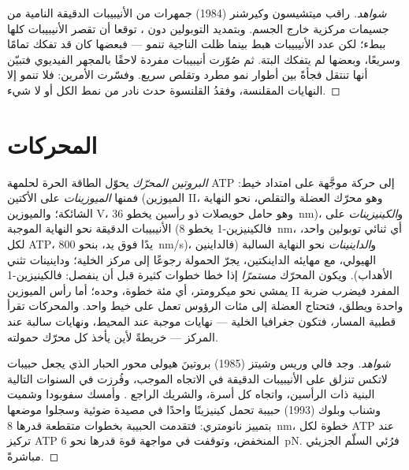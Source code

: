 \begin{proof}[شواهد]
راقب ميتشيسون وكيرشنر (1984) جمهرات من الأنيبيبات الدقيقة
النامية من جسيمات مركزية خارج الجسم. وبتمديد التوبولين دون
، توقعا أن تقصر الأنيبيبات كلها
ببطء؛ لكن عدد الأنيبيبات هبط بينما ظلت الناجية
تنمو --- فبعضها كان قد تفكك تمامًا وسريعًا، وبعضها لم يتفكك
البتة. ثم صُوّرت أنيبيبات مفردة لاحقًا بالمجهر الفيديوي فتبيّن أنها
تنتقل فجأةً بين أطوار نمو مطرد وتقلص سريع.
وفسّرت  الأمرين: فلا تنمو إلا النهايات المقلنسة، وفقدُ
القلنسوة حدث نادر من نمط الكل أو لا شيء.
\end{proof}

\section{المحركات}

\begin{definition}\label{def:b3:cytoskeleton-motility:motors}
\emph{البروتين المحرّك} يحوّل الطاقة الحرة لحلمهة ATP إلى
حركة موجَّهة على امتداد خيط: فمنها \emph{الميوزينات} على الأكتين (الميوزين
II، وهو محرّك العضلة والتقلص، نحو النهاية الشائكة؛ والميوزين V،
وهو حامل حويصلات ذو رأسين يخطو \qty{36}{nm})، و\emph{الكينيزينات}
على الأنيبيبات الدقيقة نحو النهاية الموجبة (فالكينيزين-1 يخطو \qty{8}{nm}،
أي ثنائي توبولين واحد، لكل ATP، يدًا فوق يد، بنحو \qty{800}{nm/s})،
و\emph{الداينينات} نحو النهاية السالبة (فالداينين الهيولي، مع
مهايئه الداينكتين، يجرّ الحمولة رجوعًا إلى مركز الخلية؛ وداينينات 
تثني الأهداب). ويكون المحرّك \emph{مستمرًا} إذا خطا خطوات كثيرة قبل أن
ينفصل: فالكينيزين-1 يمشي نحو ميكرومتر، أي مئة خطوة، وحده؛
أما رأس الميوزين II المفرد فيضرب ضربة واحدة ويطلق، فتحتاج العضلة إلى
مئات الرؤوس تعمل على خيط واحد. والمحركات تقرأ قطبية
المسار، فتكون جغرافيا الخلية --- نهايات موجبة عند المحيط، ونهايات
سالبة عند المركز --- خريطةً لأين يأخذ كل محرّك
حمولته.
\end{definition}

\begin{proof}[شواهد]
وجد فالي وريس وشيتز (1985)  بروتينَ هيولى محور
الحبار الذي يجعل حبيبات لاتكس تنزلق على الأنيبيبات الدقيقة في الاتجاه
الموجب، وفُرزت في السنوات التالية البنية ذات الرأسين، واتجاه
كل أسرة، والشريك الراجع .
وأمسك سفوبودا وشميت وشناب وبلوك (1993) حبيبة تحمل
كينيزينًا واحدًا في مصيدة ضوئية وسجلوا موضعها بتمييز
نانومتري: فتقدمت الحبيبة بخطوات متقطعة قدرها
\qty{8}{nm}، خطوة لكل ATP عند تركيز ATP المنخفض، وتوقفت في مواجهة
قوة قدرها نحو \qty{6}{pN}. فرُئي السلّم الجزيئي
مباشرةً.
\end{proof}

